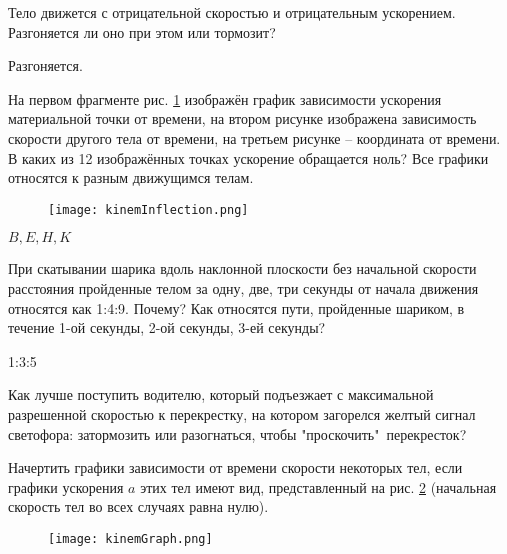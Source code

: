 \begin{ex} %
Тело движется с отрицательной скоростью и отрицательным ускорением. Разгоняется ли оно при этом или тормозит?
\begin{ans}
Разгоняется.
\end{ans}
\end{ex}

\begin{ex} %
На первом фрагменте рис. \ref{kinemInflection} изображён график зависимости ускорения материальной точки от времени, на втором рисунке изображена зависимость скорости другого тела от времени, на третьем рисунке – координата от времени. В каких из 12 изображённых точках ускорение обращается ноль? Все графики относятся к разным движущимся телам.

\begin{figure}[h]
\centering
\texttt{[image: kinemInflection.png]}
\caption{}
\label{kinemInflection}
\end{figure}
\begin{ans}
$B, E, H, K$
\end{ans}
\end{ex}

\begin{ex} %
При скатывании шарика вдоль наклонной плоскости без начальной скорости расстояния пройденные телом за одну, две, три секунды от начала движения относятся как 1:4:9. Почему? Как относятся пути, пройденные шариком, в течение 1-ой секунды, 2-ой секунды, 3-ей секунды?
\begin{ans}
1:3:5
\end{ans}
\end{ex}

\begin{ex} %
Как лучше поступить водителю, который подъезжает с максимальной разрешенной скоростью к перекрестку, на котором загорелся желтый сигнал светофора: затормозить или разогнаться, чтобы "проскочить"\ перекресток?
\end{ex}

\simpleProblems

\begin{ex} %
Начертить графики зависимости от времени скорости некоторых тел, если графики ускорения $a$ этих тел имеют вид, представленный на рис. \ref{kinemGraph} (начальная скорость тел во всех случаях равна нулю).

\begin{figure}[h]
\centering
\texttt{[image: kinemGraph.png]}
\caption{}
\label{kinemGraph}
\end{figure}
\end{ex}

